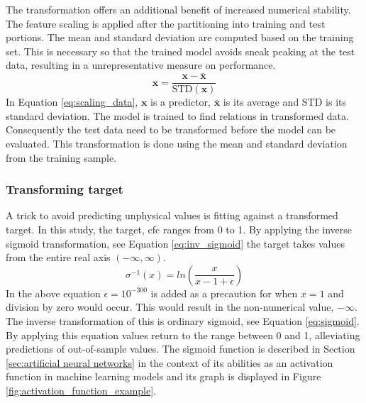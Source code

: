 The transformation offers an additional benefit of increased numerical stability. %
The feature scaling is applied after the partitioning into training and test portions. The mean and standard deviation are computed based on the training set. This is necessary so that the trained model avoids sneak peaking at the test data, resulting in a unrepresentative measure on performance.
\begin{equation} \label{eq:scaling_data}
    \mathbf{x} = \frac{\mathbf{x} - \bar{\mathbf{x}}}{\text{STD}(\mathbf{x})}
\end{equation}
In Equation \eqref{eq:scaling_data}, $\mathbf{x}$ is a predictor,  $\bar{\mathbf{x}}$ is its average and STD is its standard deviation. The model is trained to find relations in transformed data. Consequently the test data need to be transformed before the model can be evaluated. This transformation is done using the mean and standard deviation from the training sample.

\subsubsection{Transforming target} \label{sec:transforming_target}
A trick to avoid predicting unphysical values is fitting against a transformed target. In this study, the target, \acrfull{cfc} ranges from 0 to 1. By applying the inverse sigmoid transformation, see Equation \eqref{eq:inv_sigmoid} the target takes values from the entire real axis $(-\infty, \infty)$. 
\begin{equation} \label{eq:inv_sigmoid}
   \sigma^{-1} \left( x \right) = ln \left(\frac{x}{x - 1 + \epsilon} \right)
\end{equation}
In the above equation $\epsilon = 10^{-300}$ is added as a precaution for when $x=1$ and division by zero would occur. This would result in the non-numerical value, $-\infty$. The inverse transformation of this is ordinary sigmoid, see Equation \eqref{eq:sigmoid}. By applying this equation values return to the range between 0 and 1, alleviating predictions of out-of-sample values. The sigmoid function is described in Section \ref{sec:artificial neural networks} in the context of its abilities as an activation function in machine learning models and its graph is displayed in Figure \ref{fig:activation_function_example}.

